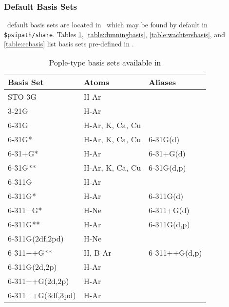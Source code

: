\subsubsection{Default Basis Sets}

\PSIthree\ default basis sets are located in \pbasisdat\ which may be
found by default in {\tt \$psipath/share}. Tables
\ref{table:poplebasis}, \ref{table:dunningbasis},
\ref{table:wachtersbasis}, and \ref{table:ccbasis} list basis sets
pre-defined in \pbasisdat.

\begin{table}[p]
\caption{Pople-type basis sets available in \PSIthree}
\label{table:poplebasis}
\begin{center}
\begin{tabular}{|l|l|l|}
\hline
\hline
Basis Set 		&Atoms   	&Aliases\\ 
\hline
	STO-3G			& H-Ar			&\\
	3-21G			& H-Ar			&\\
	6-31G			& H-Ar, K, Ca, Cu	&\\
        6-31G*                  & H-Ar, K, Ca, Cu       &6-31G(d)\\
        6-31+G*                 & H-Ar                  &6-31+G(d)\\
        6-31G**                 & H-Ar, K, Ca, Cu       &6-31G(d,p)\\
	6-311G			& H-Ar			&\\
	6-311G*                 & H-Ar                  &6-311G(d)\\
        6-311+G*                & H-Ne                  &6-311+G(d)\\
	6-311G**                & H-Ar                  &6-311G(d,p)\\
        6-311G(2df,2pd)         & H-Ne                  &\\
	6-311++G**		& H, B-Ar		&6-311++G(d,p)\\
        6-311G(2d,2p)           & H-Ar                  &\\
        6-311++G(2d,2p)         & H-Ar                  &\\
        6-311++G(3df,3pd)       & H-Ar                  &\\
\hline
\hline
\end{tabular}
\end{center}
\end{table}

